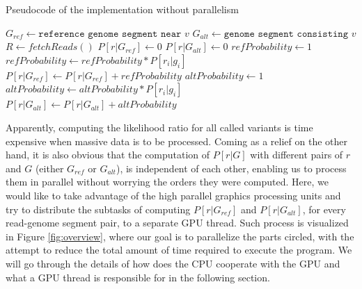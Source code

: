 \documentclass{PHlab-thesis}
\begin{document}
\begin{algorithm}
	\caption{Pseudocode of the implementation without parallelism}
	\label{alg:loop}
	\begin{algorithmic}
		\State $G_{ref} \gets \texttt{reference genome segment near } v$
		\State $G_{alt} \gets \texttt{genome segment consisting } v$
		\State $R \gets fetchReads()$ 
			\State $P[r|G_{ref}] \gets 0$
			\State $P[r|G_{alt}] \gets 0$
				\State $refProbability \gets 1$
					\State $refProbability \gets refProbability * P[r_i|g_i]$
				\EndFor
				\State $P[r|G_{ref}] \gets P[r|G_{ref}] + refProbability$
			\EndFor
				\State $altProbability \gets 1$
					\State $altProbability \gets altProbability * P[r_i|g_i]$
				\EndFor
				\State $P[r|G_{alt}] \gets P[r|G_{alt}] + altProbability$
			\EndFor
		\EndFor
	\EndFor
	\end{algorithmic}
\end{algorithm}
Apparently, computing the likelihood ratio for all called variants is time expensive when massive data is to be processed. Coming as a relief on the other hand, it is also obvious that the computation of $P[r|G]$ with different pairs of $r$ and $G$ (either $G_{ref}$ or $G_{alt}$), is independent of each other, enabling us to process them in parallel without worrying the orders they were computed. Here, we would like to take advantage of the high parallel graphics processing units and try to distribute the subtasks of computing $P[r|G_{ref}]$ and $P[r|G_{alt}]$, for every read-genome segment pair, to a separate GPU thread. Such process is visualized in Figure \ref{fig:overview}, where our goal is to parallelize the parts circled, with the attempt to reduce the total amount of time required to execute the program. We will go through the details of how does the CPU cooperate with the GPU and what a GPU thread is responsible for in the following section.
\end{document}
